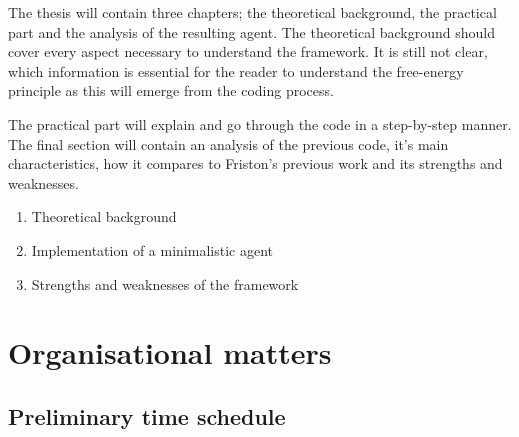 \documentclass[11pt,
  paper=a4,
  bibliography=totocnumbered,
	captions=tableheading,
	BCOR=10mm
]{scrreprt}
\theoremstyle{definition}
\begin{document}
The thesis will contain three chapters; the theoretical background, the practical part and the analysis of the resulting agent. The theoretical background should cover every aspect necessary to understand the framework. It is still not clear, which information is essential for the reader to understand the free-energy principle as this will emerge from the coding process.

The practical part will explain and go through the code in a step-by-step manner. The final section will contain an analysis of the previous code, it's main characteristics, how it compares to Friston's previous work and its strengths and weaknesses.



\begin{enumerate}
    \item Theoretical background
    \item Implementation of a minimalistic agent
    \item Strengths and weaknesses of the framework
\end{enumerate}

\chapter{Organisational matters}

\section{Preliminary time schedule}
\end{document}
